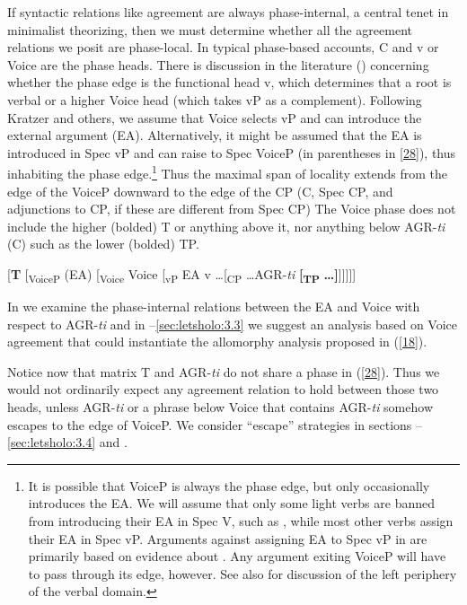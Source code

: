 \documentclass[output=paper,
modfonts
]{langscibook}
\begin{document}
If syntactic relations like agreement are always phase-internal, a central tenet in minimalist theorizing, then we must determine whether all the agreement relations we posit are phase-local. In typical phase-based accounts, C and v or Voice are the phase heads. There is discussion in the literature (\citealt{Kratzer1996,Harley2013,Legate2012,Safir2017})  concerning whether the phase edge is the functional head v, which determines that a root is verbal or a higher Voice head (which takes vP as a complement). 
Following Kratzer and others, we assume that Voice selects vP and can introduce the external argument (EA). Alternatively, it might be assumed that the EA is introduced in Spec vP and can raise to Spec VoiceP (in parentheses in \ref{28}), thus inhabiting the phase edge.\footnote{\label{fn8}It is possible that VoiceP is always the phase edge, but only occasionally introduces the EA. We will assume that only some light verbs are banned from introducing their EA in Spec V, such as , while most other verbs assign their EA in Spec vP. Arguments against assigning EA to Spec vP in \citet{Pylkkaenen2008} are primarily based on evidence about . Any argument exiting VoiceP will have to pass through its edge, however. See also \citet{Safir2017}  for discussion of the left periphery of the verbal domain.}  Thus the maximal span of locality extends from the edge of the VoiceP downward to the edge of the CP (C, Spec CP, and adjunctions to CP, if these are different from Spec CP) The Voice phase does not include the higher (bolded) T or anything above it, nor anything below AGR-\textit{ti} (C) such as the lower (bolded) TP. 


\ea \label{28} \textup{[\textbf{T}  { }  [\textsubscript{VoiceP} (EA) [\textsubscript{Voice} Voice [\textsubscript{vP} EA v …[\textsubscript{CP} …AGR-\textit{ti} \textbf{[}\textsubscript{\textbf{TP}} \textbf{…]}]]]]]} \z


In  we examine the phase-internal relations between the EA and Voice with respect to AGR-\textit{ti} and in --\ref{sec:letsholo:3.3} we suggest an analysis based on Voice agreement that could instantiate the allomorphy analysis proposed in (\ref{18}). 

Notice now that matrix T and AGR-\textit{ti} do not share a phase in (\ref{28}). Thus we would not ordinarily expect any agreement relation to hold between those two heads, unless AGR-\textit{ti} or a phrase below Voice that contains AGR-\textit{ti} somehow escapes to the edge of VoiceP. We consider ``escape'' strategies in sections --\ref{sec:letsholo:3.4} and .
\end{document}
